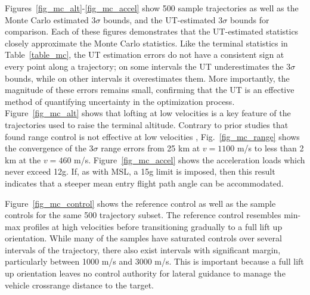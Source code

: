 \documentclass[journal ]{new-aiaa}
\begin{document}
Figures~\ref{fig_mc_alt}-\ref{fig_mc_accel} show 500 sample trajectories as well as the Monte Carlo estimated 3$\sigma$ bounds, and the UT-estimated 3$\sigma$ bounds for comparison. Each of these figures demonstrates that the UT-estimated statistics closely approximate the Monte Carlo statistics. Like the terminal statistics in Table~\ref{table_mc}, the UT estimation errors do not have a consistent sign at every point along a trajectory; on some intervals the UT underestimates the 3$\sigma$ bounds, while on other intervals it overestimates them. More importantly, the magnitude of these errors remains small, confirming that the UT is an effective method of quantifying uncertainty in the optimization process. 
Figure~\ref{fig_mc_alt} shows that lofting at low velocities is a key feature of the trajectories used to raise the terminal altitude. Contrary to prior studies that found range control is not effective at low velocities \cite{MSL_EDL2}, Fig.~\ref{fig_mc_range} shows the convergence of the 3$\sigma$ range errors from 25 km at $ v=1100 $ m/s to less than 2 km at the $v=460$ m/s. 
Figure~\ref{fig_mc_accel} shows the acceleration loads which never exceed 12g. If, as with MSL, a 15g limit is imposed, then this result indicates that a steeper mean entry flight path angle can be accommodated.

Figure~\ref{fig_mc_control} shows the reference control as well as the sample controls for the same 500 trajectory subset. The reference control resembles min-max profiles at high velocities before transitioning gradually to a full lift up orientation. While many of the samples have saturated controls over several intervals of the trajectory, there also exist intervals with significant margin, particularly between 1000 m/s and 3000 m/s. This is important because a full lift up orientation leaves no control authority for lateral guidance to manage the vehicle crossrange distance to the target.
\end{document}
